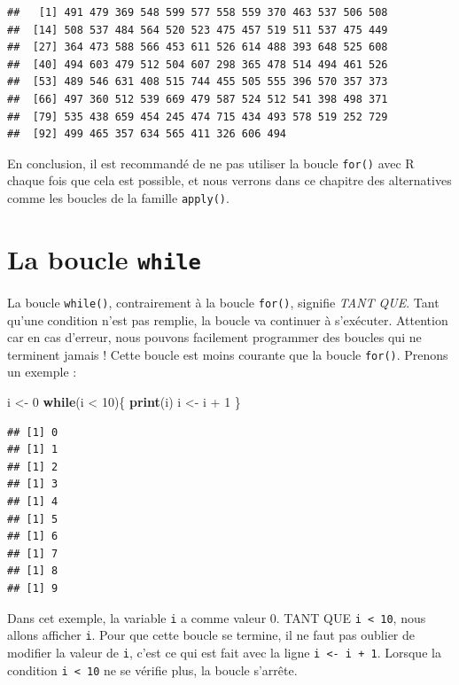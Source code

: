 \documentclass[twoside,symmetric]{book}
\newenvironment{Shaded}{}{}
\newcommand{\ControlFlowTok}[1]{\textbf{#1}}
\newcommand{\DecValTok}[1]{#1}
\newcommand{\KeywordTok}[1]{\textbf{#1}}
\newcommand{\NormalTok}[1]{#1}
\newcommand{\OperatorTok}[1]{#1}
\newcommand{\StringTok}[1]{#1}
\begin{document}
\begin{verbatim}
##   [1] 491 479 369 548 599 577 558 559 370 463 537 506 508
##  [14] 508 537 484 564 520 523 475 457 519 511 537 475 449
##  [27] 364 473 588 566 453 611 526 614 488 393 648 525 608
##  [40] 494 603 479 512 504 607 298 365 478 514 494 461 526
##  [53] 489 546 631 408 515 744 455 505 555 396 570 357 373
##  [66] 497 360 512 539 669 479 587 524 512 541 398 498 371
##  [79] 535 438 659 454 245 474 715 434 493 578 519 252 729
##  [92] 499 465 357 634 565 411 326 606 494
\end{verbatim}

En conclusion, il est recommandé de ne pas utiliser la boucle \texttt{for()} avec R chaque fois que cela est possible, et nous verrons dans ce chapitre des alternatives comme les boucles de la famille \texttt{apply()}.

\hypertarget{l17while}{%
\section{\texorpdfstring{La boucle \texttt{while}}{La boucle while}}\label{l17while}}

La boucle \texttt{while()}, contrairement à la boucle \texttt{for()}, signifie \emph{TANT QUE}. Tant qu'une condition n'est pas remplie, la boucle va continuer à s'exécuter. Attention car en cas d'erreur, nous pouvons facilement programmer des boucles qui ne terminent jamais ! Cette boucle est moins courante que la boucle \texttt{for()}. Prenons un exemple :

\begin{Shaded}
\begin{Highlighting}[]
\NormalTok{i <-}\StringTok{ }\DecValTok{0}
\ControlFlowTok{while}\NormalTok{(i }\OperatorTok{<}\StringTok{ }\DecValTok{10}\NormalTok{)\{}
  \KeywordTok{print}\NormalTok{(i)}
\NormalTok{  i <-}\StringTok{ }\NormalTok{i }\OperatorTok{+}\StringTok{ }\DecValTok{1}
\NormalTok{\}}
\end{Highlighting}
\end{Shaded}

\begin{verbatim}
## [1] 0
## [1] 1
## [1] 2
## [1] 3
## [1] 4
## [1] 5
## [1] 6
## [1] 7
## [1] 8
## [1] 9
\end{verbatim}

Dans cet exemple, la variable \texttt{i} a comme valeur 0. TANT QUE \texttt{i\ \textless{}\ 10}, nous allons afficher \texttt{i}. Pour que cette boucle se termine, il ne faut pas oublier de modifier la valeur de \texttt{i}, c'est ce qui est fait avec la ligne \texttt{i\ \textless{}-\ i\ +\ 1}. Lorsque la condition \texttt{i\ \textless{}\ 10} ne se vérifie plus, la boucle s'arrête.
\end{document}
